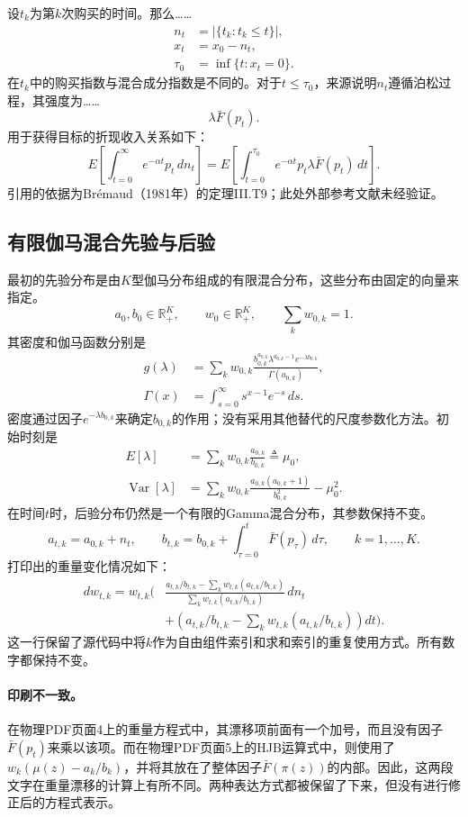 \documentclass{article}
\begin{document}
设\(t_k\)为第\(k\)次购买的时间。那么……
\begin{align*}
n_t&=\bigl|\{t_k:t_k\leq t\}\bigr|,\\
x_t&=x_0-n_t,\\
\tau_0&=\inf\{t:x_t=0\}.
\end{align*}
在\(t_k\)中的购买指数与混合成分指数是不同的。对于\(t\leq\tau_0\)，来源说明\(n_t\)遵循泊松过程，其强度为……
\[
\lambda\bar F(p_t).
\]
用于获得目标的折现收入关系如下：
\[
E\left[\int_{t=0}^{\infty}e^{-\alpha t}p_t\,dn_t\right]
=
E\left[\int_{t=0}^{\tau_0}e^{-\alpha t}p_t\lambda\bar F(p_t)\,dt\right].
\]
引用的依据为Br\'emaud（1981年）的定理III.T9；此处外部参考文献未经验证。

\subsection*{有限伽马混合先验与后验}
最初的先验分布是由\(K\)型伽马分布组成的有限混合分布，这些分布由固定的向量来指定。
\[
a_0,b_0\in\mathbb R_+^K,\qquad
w_0\in\mathbb R_+^K,\qquad
\sum_k w_{0,k}=1.
\]
其密度和伽马函数分别是
\begin{align*}
g(\lambda)
&=\sum_k w_{0,k}
\frac{b_{0,k}^{a_{0,k}}\lambda^{a_{0,k}-1}e^{-\lambda b_{0,k}}}
{\Gamma(a_{0,k})},\\
\Gamma(x)&=\int_{s=0}^{\infty}s^{x-1}e^{-s}\,ds.
\end{align*}
密度通过因子\(e^{-\lambda b_{0,k}}\)来确定\(b_{0,k}\)的作用；没有采用其他替代的尺度参数化方法。初始时刻是
\begin{align*}
E[\lambda]&=\sum_k w_{0,k}\frac{a_{0,k}}{b_{0,k}}\triangleq\mu_0,\\
\operatorname{Var}[\lambda]
&=\sum_k w_{0,k}\frac{a_{0,k}(a_{0,k}+1)}{b_{0,k}^2}-\mu_0^2.
\end{align*}
在时间\(t\)时，后验分布仍然是一个有限的Gamma混合分布，其参数保持不变。
\[
a_{t,k}=a_{0,k}+n_t,
\qquad
b_{t,k}=b_{0,k}+\int_{\tau=0}^{t}\bar F(p_\tau)\,d\tau,
\qquad k=1,\ldots,K.
\]
打印出的重量变化情况如下：
\[
\begin{aligned}
dw_{t,k}=w_{t,k}\Bigg(&
\frac{a_{t,k}/b_{t,k}-\sum_k w_{t,k}(a_{t,k}/b_{t,k})}
{\sum_k w_{t,k}(a_{t,k}/b_{t,k})}\,dn_t\\
&+\left(a_{t,k}/b_{t,k}-\sum_k w_{t,k}(a_{t,k}/b_{t,k})\right)dt
\Bigg).
\end{aligned}
\]
这一行保留了源代码中将\(k\)作为自由组件索引和求和索引的重复使用方式。所有数字都保持不变。

\paragraph{印刷不一致。}
在物理PDF页面4上的重量方程式中，其漂移项前面有一个加号，而且没有因子\(\bar F(p_t)\)来乘以该项。而在物理PDF页面5上的HJB运算式中，则使用了\(w_k(\mu(z)-a_k/b_k)\)，并将其放在了整体因子\(\bar F(\pi(z))\)的内部。因此，这两段文字在重量漂移的计算上有所不同。两种表达方式都被保留了下来，但没有进行修正后的方程式表示。
\end{document}
